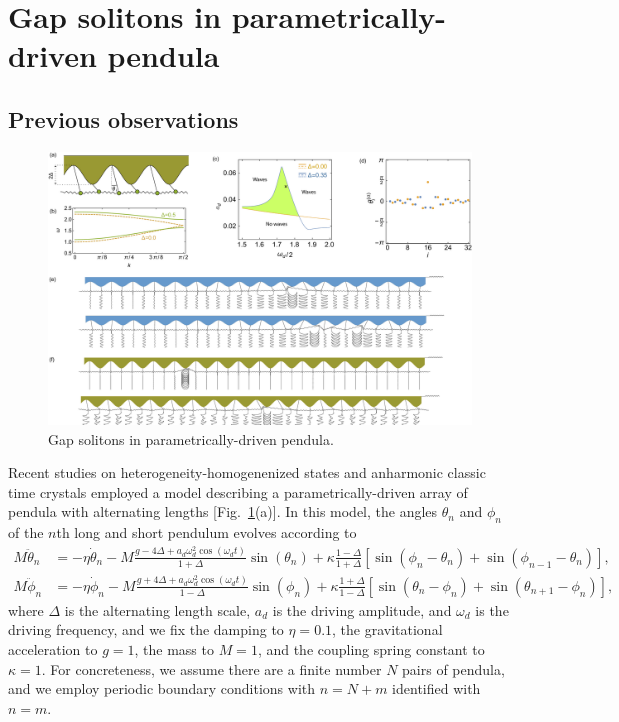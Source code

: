 \documentclass[aps,pre,amsmath,amssymb,floatfix,onecolumn,notitlepage,10pt]{revtex4-1}
\begin{document}
\section{Gap solitons in parametrically-driven pendula}
\subsection{Previous observations}
\begin{figure}[hbt]
\includegraphics[width=\columnwidth]{pendula}
\caption{Gap solitons in parametrically-driven pendula. \label{fig1}}
\end{figure}
Recent studies on heterogeneity-homogenenized states \cite{2021_Nicolaou_1} and anharmonic classic time crystals \cite{2021_Nicolaou_2} employed a model describing a parametrically-driven array of pendula with alternating lengths [Fig.~\ref{fig1}(a)]. In this model, the angles $\theta_n$ and $\phi_n$ of the $n$th long and short pendulum evolves according to
\begin{align}
M \ddot{\theta}_n &= -\eta \dot{\theta}_n-M \frac{g - 4\Delta +  a_d \omega_d^2 \cos(\omega_d t)}{1+\Delta}\sin(\theta_n) +\kappa \frac{1-\Delta}{1+\Delta} \left[\sin(\phi_n-\theta_n) + \sin(\phi_{n-1}-\theta_n)\right],  \label{pendula1} \\
M \ddot{\phi}_n &= -\eta \dot{\phi}_n-M \frac{g + 4\Delta +  a_d \omega_d^2 \cos(\omega_d t)}{1-\Delta}\sin(\phi_n) +\kappa \frac{1+\Delta}{1-\Delta} \left[\sin(\theta_n-\phi_n) + \sin(\theta_{n+1}-\phi_n)\right], \label{pendula2}
\end{align}
where $\Delta$ is the alternating length scale, $a_d$ is the driving amplitude, and $\omega_d$ is the driving frequency, and we fix the damping to $\eta=0.1$, the gravitational acceleration to $g=1$, the mass to $M=1$, and the coupling spring constant to $\kappa=1$. For concreteness, we assume there are a finite number $N$ pairs of pendula, and we employ periodic boundary conditions with $n=N+m$ identified with $n=m$. 
\end{document}
